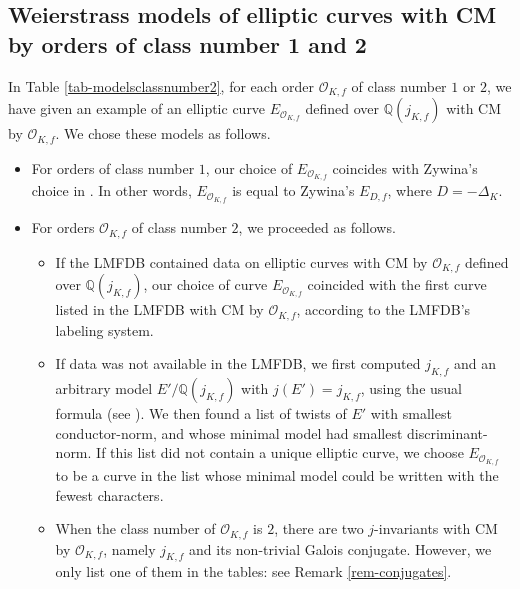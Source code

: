 \documentclass[11pt]{amsart}
\theoremstyle{definition}
\newcommand{\Q}{\mathbb Q}
\newcommand{\QQ}{\mathbb Q}
\newcommand{\Of}{\mathcal{O}_{K,f}}
\begin{document}
\subsection{Weierstrass models of elliptic curves with CM by orders of class number 1 and 2} \label{sec-choiceofmodels}

In Table \ref{tab-modelsclassnumber2}, for each order $\Of$ of class number $1$ or $2$, we have given an example of an elliptic curve $E_{\Of}$ defined over $\Q(j_{K,f})$ with CM by $\Of$. We chose these models as follows. 
\begin{itemize} 
\item For orders of class number $1$, our choice of $E_{\Of}$ coincides with Zywina's choice in \cite{zywina}. In other words, $E_{\Of}$ is equal to Zywina's $E_{D,f}$, where $D=-\Delta_K$. 

\item For orders $\Of$ of class number $2$, we proceeded as follows. 
    \begin{itemize}
        \item  If the LMFDB contained data on elliptic curves with CM by $\Of$ defined over $\Q(j_{K,f})$, our choice of curve $E_{\Of}$ coincided with the first curve listed in the LMFDB with CM by $\Of$, according to the LMFDB's labeling system. 
        \item  If data was not available in the LMFDB, we first computed $j_{K,f}$ and an arbitrary model $E'/\Q(j_{K,f})$ with $j(E')=j_{K,f}$, using the usual formula (see \cite[Ch. III, Prop. 1.4]{silverman1}). We then found a list of twists of $E'$ with smallest conductor-norm, and whose minimal model had smallest discriminant-norm. If this list did not contain a unique elliptic curve, we choose $E_{\Of}$ to be a curve in the list whose minimal model could be written with the fewest characters.
        \item When the class number of $\Of$ is $2$, there are two $j$-invariants with CM by $\Of$, namely $j_{K,f}$ and its non-trivial Galois conjugate. However, we only list one of them in the tables: see Remark \ref{rem-conjugates}.
    \end{itemize}
\end{itemize}



\label{sec-zywinasresults}
\end{document}
